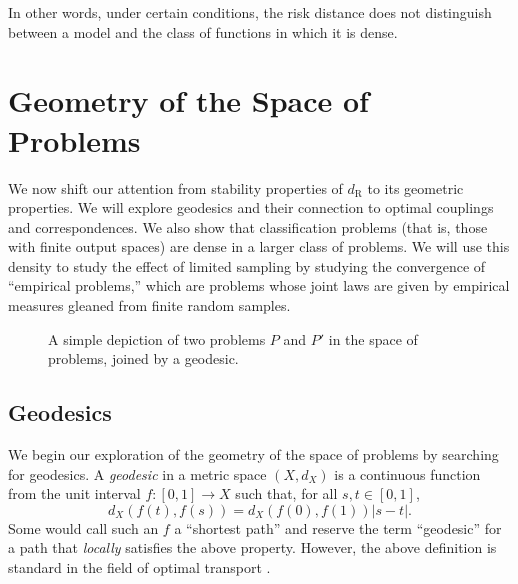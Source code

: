 \documentclass[twoside,11pt]{article}
\newcommand{\dexp}[1][]{d_{\mathrm{R}#1}}
\begin{document}
    In other words, under certain conditions, the risk distance does not distinguish between a model and the class of functions in which it is dense.

    

\section{Geometry of the Space of Problems}
\label{sec:geometry}
We now shift our attention from stability properties of $\dexp$ to its geometric properties. We will explore geodesics and their connection to optimal couplings and correspondences. We also show that classification problems (that is, those with finite output spaces) are dense in a larger class of problems. We will use this density to study the effect of limited sampling by studying the convergence of ``empirical problems,'' which are problems whose joint laws are given by empirical measures gleaned from finite random samples.

\begin{figure}
    \centering
    \caption{A simple depiction of two problems $P$ and $P'$ in the space of problems, joined by a geodesic.}
\end{figure}

\subsection{Geodesics}\label{subsec:geodesics}
    We begin our exploration of the geometry of the space of problems by searching for geodesics. A \emph{geodesic} in a metric space $(X,d_X)$ is a continuous function from the unit interval $f:[0,1]\to X$ such that, for all $s,t\in [0,1]$,
    \[d_X(f(t),f(s)) = d_X(f(0),f(1))|s-t|.\]
    Some would call such an $f$ a ``shortest path'' \citep[Chapter 2.5]{BBI} and reserve the term ``geodesic'' for a path that \emph{locally} satisfies the above property. However, the above definition is standard in the field of optimal transport \citep[Section 9.2, Eq. 9.4]{ambrosio_lectures_2021}.
\end{document}
